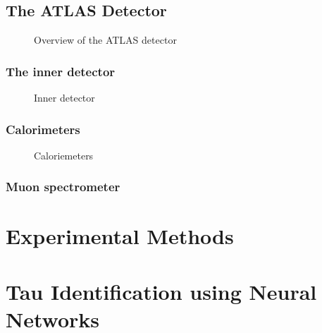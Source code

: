 \documentclass[PhD, UKenglish]{scrbook}
\begin{document}
\section{The ATLAS Detector}

\begin{figure}[htbp]
  \centering

  \caption{Overview of the ATLAS detector}
  \label{fig:atlas_detector_overview}
\end{figure}



\subsection{The inner detector}

\begin{figure}[htbp]
  \centering

  \caption{Inner detector}
  \label{fig:atlas_inner_detector}
\end{figure}


\subsection{Calorimeters}

\begin{figure}[htbp]
  \centering

  \caption{Caloriemeters}
  \label{fig:atlas_calorimeters}
\end{figure}


\subsection{Muon spectrometer}


\chapter{Experimental Methods}%
\label{sec:experimental_methods}




\chapter{Tau Identification using Neural Networks}%
\label{sec:tauid}

\end{document}
